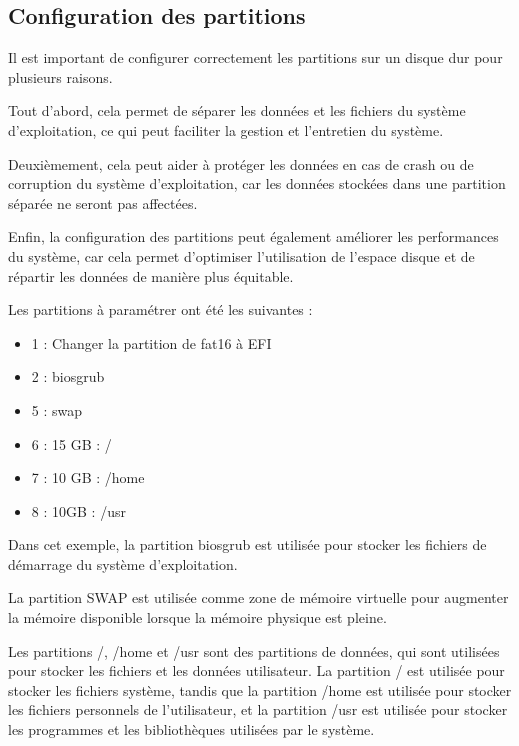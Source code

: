 \documentclass[12pt,a4paper]{article}
\begin{document}
\begin{flushleft}
       \subsection{Configuration des partitions}
       \begin{flushleft}
        \noindent Il est important de configurer correctement les partitions sur un disque dur pour plusieurs raisons. 
       \item Tout d'abord, cela permet de séparer les données et les fichiers du système d'exploitation, ce qui peut faciliter la gestion et l'entretien du système. 
       \item Deuxièmement, cela peut aider à protéger les données en cas de crash ou de corruption du système d'exploitation, car les données stockées dans une partition séparée ne seront pas affectées. 
       \item Enfin, la configuration des partitions peut également améliorer les performances du système, car cela permet d'optimiser l'utilisation de l'espace disque et de répartir les données de manière plus équitable.
       \item Les partitions à paramétrer ont été les suivantes : 
       \begin{itemize}
           \item 1 : Changer la partition de fat16 à EFI
           \item 2 : biosgrub
           \item 5 : swap
           \item 6 : 15 GB : / 
           \item 7 : 10 GB : /home
           \item 8 : 10GB : /usr 
       \end{itemize}
       \item Dans cet exemple, la partition biosgrub est utilisée pour stocker les fichiers de démarrage du système d'exploitation. 
       \item La partition SWAP est utilisée comme zone de mémoire virtuelle pour augmenter la mémoire disponible lorsque la mémoire physique est pleine. \item Les partitions /, /home et /usr sont des partitions de données, qui sont utilisées pour stocker les fichiers et les données utilisateur. La partition / est utilisée pour stocker les fichiers système, tandis que la partition /home est utilisée pour stocker les fichiers personnels de l'utilisateur, et la partition /usr est utilisée pour stocker les programmes et les bibliothèques utilisées par le système.
       \end{flushleft}
       

\end{flushleft}
\end{document}
